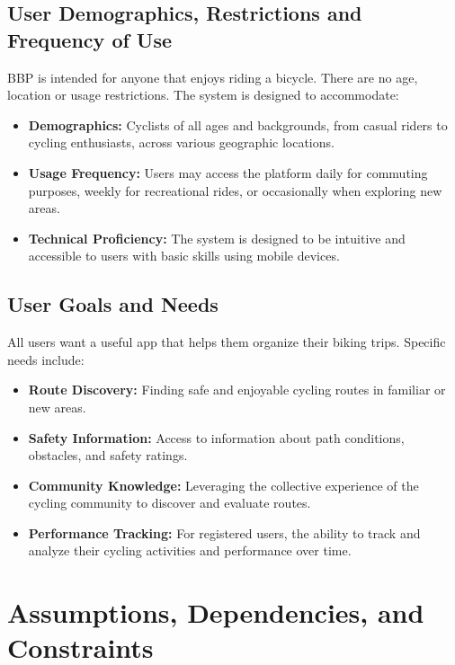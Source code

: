 \subsection{User Demographics, Restrictions and Frequency of Use}
\label{subsec:user_demographics}%

BBP is intended for anyone that enjoys riding a bicycle. There are no age, location or usage restrictions. The system is designed to accommodate:
\begin{itemize}
    \item \textbf{Demographics:} Cyclists of all ages and backgrounds, from casual riders to cycling enthusiasts, across various geographic locations.
    \item \textbf{Usage Frequency:} Users may access the platform daily for commuting purposes, weekly for recreational rides, or occasionally when exploring new areas.
    \item \textbf{Technical Proficiency:} The system is designed to be intuitive and accessible to users with basic skills using mobile devices.
\end{itemize}

\subsection{User Goals and Needs}
\label{subsec:user_goals_needs}%

All users want a useful app that helps them organize their biking trips. Specific needs include:
\begin{itemize}
    \item \textbf{Route Discovery:} Finding safe and enjoyable cycling routes in familiar or new areas.
    \item \textbf{Safety Information:} Access to information about path conditions, obstacles, and safety ratings.
    \item \textbf{Community Knowledge:} Leveraging the collective experience of the cycling community to discover and evaluate routes.
    \item \textbf{Performance Tracking:} For registered users, the ability to track and analyze their cycling activities and performance over time.
\end{itemize}

\section{Assumptions, Dependencies, and Constraints}
\label{sec:assumptions_dependencies_constraints}%

